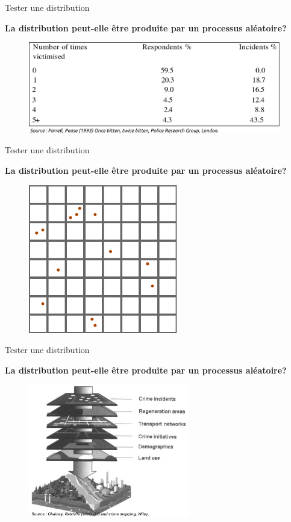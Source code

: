 \begin{frame}{Tester une distribution}

\textbf{La distribution peut-elle être produite par un processus aléatoire?}

\begin{figure}
  \includegraphics[width=11cm]{CrimeConcentration.pdf}
\end{figure}

\end{frame}


\begin{frame}{Tester une distribution}

\textbf{La distribution peut-elle être produite par un processus aléatoire?}

\begin{figure}
  \includegraphics[width=6.5cm]{ExPoisson.pdf}
\end{figure}

\end{frame}


\begin{frame}{Tester une distribution}

\textbf{La distribution peut-elle être produite par un processus aléatoire?}

\begin{figure}
  \includegraphics[width=7cm]{Chainey.jpg}
\end{figure}

\end{frame}


